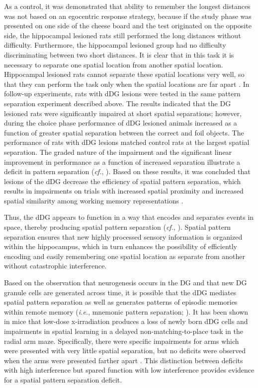 \documentclass[doc, longtable]{apa6}
\begin{document}
As a control, it was demonstrated that ability to remember the longest distances was not based on an egocentric response strategy, because if the study phase was presented on one side of the cheese board and the test originated on the opposite side, the hippocampal lesioned rats still performed the long distances without difficulty. Furthermore, the hippocampal lesioned group had no difficulty discriminating between two short distances. It is clear that in this task it is necessary to separate one spatial location from another spatial location. Hippocampal lesioned rats cannot separate these spatial locations very well, so that they can perform the task only when the spatial locations are far apart \parencite{Gilbert1998a}. In follow-up experiments, rats with dDG lesions were tested in the same pattern separation experiment described above. The results indicated that the DG lesioned rats were significantly impaired at short spatial separations; however, during the choice phase performance of dDG lesioned animals increased as a function of greater spatial separation between the correct and foil objects. The performance of rats with dDG lesions matched control rats at the largest spatial separation. The graded nature of the impairment and the significant linear improvement in performance as a function of increased separation illustrate a deficit in pattern separation (\textit{cf.}, \cite{hunsaker2013operation}). Based on these results, it was concluded that lesions of the dDG decrease the efficiency of spatial pattern separation, which results in impairments on trials with increased spatial proximity and increased spatial similarity among working memory representations \parencite{Gilbert2001a}.

Thus, the dDG appears to function in a way that encodes and separates events in space, thereby producing spatial pattern separation (\textit{cf.}, \cite{Rolls1996a, Rolls2006b}). Spatial pattern separation ensures that new highly processed sensory information is organized within the hippocampus, which in turn enhances the possibility of efficiently encoding and easily remembering one spatial location as separate from another without catastrophic interference.

Based on the observation that neurogenesis occurs in the DG and that new DG granule cells are generated across time, it is possible that the dDG mediates spatial pattern separation as well as generates patterns of episodic memories within remote memory (\textit{i.e.}, mnemonic pattern separation; \cite{Aimone2006a, hunsaker2013operation}). It has been shown in mice that low-dose x-irradiation produces a loss of newly born dDG cells and impairments in spatial learning in a delayed non-matching-to-place task in the radial arm maze. Specifically, there were specific impairments for arms which were presented with very little spatial separation, but no deficits were observed when the arms were presented farther apart \parencite{Clelland2009a}. This distinction between deficits with high interference but spared function with low interference provides evidence for a spatial pattern separation deficit. 
\end{document}
